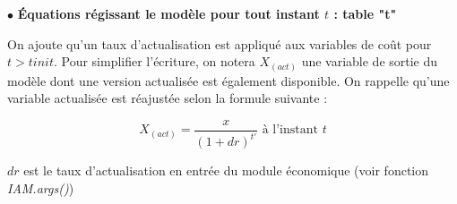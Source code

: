 \documentclass[12pt, colorinlistoftodos, notitlepage]{report}
\newenvironment{not used}[1]{%
    \longtable{%
        |>{\centering$\displaystyle}A{#1}{1}<{$}%
        |}\hline\ignorespaces}{%
    \endlongtable\ignorespacesafterend}
\newcommand{\pref}[1]{(\ref{#1})}
\begin{document}
    \hspace{10mm}$\bullet$ \textbf{Équations régissant le modèle pour tout instant $t$ : table "t"} 

    On ajoute qu'un taux d'actualisation est appliqué aux variables de coût pour $t>tinit$. Pour simplifier l'écriture, on notera $X_{(act)}$ une variable de sortie du modèle dont une version actualisée est également disponible. On rappelle qu'une variable actualisée est réajustée selon la formule suivante :

    $$
    X_{(act)} = \frac{x}{(1+dr)^{t'}} \text{ à l'instant } t
    $$

    $dr$ est le taux d'actualisation en entrée du module économique (voir fonction \textit{IAM.args()})
\end{document}
